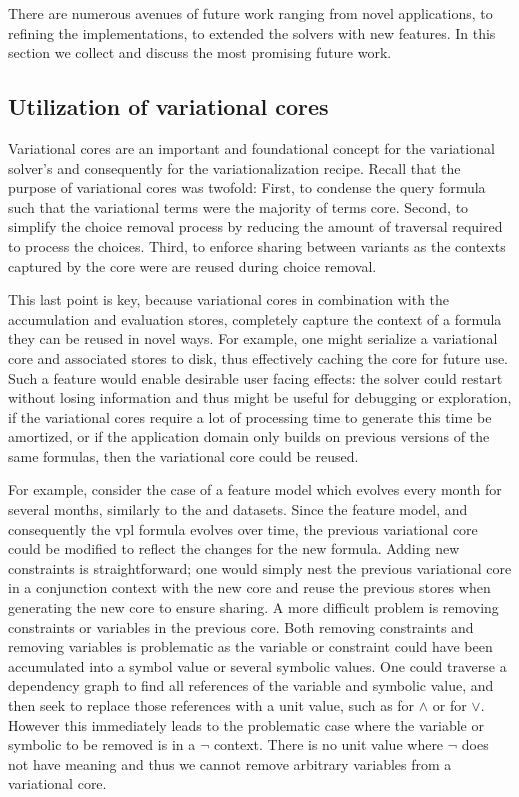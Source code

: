 \label{section:conclusion:future-work}

There are numerous avenues of future work ranging from novel applications, to
refining the implementations, to extended the solvers with new features. In this
section we collect and discuss the most promising future work.

\subsection{Utilization of variational cores}
Variational cores are an important and foundational concept for the variational
solver's and consequently for the variationalization recipe. Recall that the
purpose of variational cores was twofold: First, to condense the query formula
such that the variational terms were the majority of terms core. Second, to
simplify the choice removal process by reducing the amount of traversal required
to process the choices. Third, to enforce sharing between variants as the
contexts captured by the core were are reused during choice removal.

This last point is key, because variational cores in combination with the
accumulation and evaluation stores, completely capture the context of a formula
they can be reused in novel ways. For example, one might serialize a variational
core and associated stores to disk, thus effectively caching the core for future
use. Such a feature would enable desirable user facing effects: the solver could
restart without losing information and thus might be useful for debugging or
exploration, if the variational cores require a lot of processing time to
generate this time be amortized, or if the application domain only builds on
previous versions of the same formulas, then the variational core could be
reused.

For example, consider the case of a feature model which evolves every month for
several months, similarly to the \fin{} and \auto{} datasets. Since the feature
model, and consequently the \ac{vpl} formula evolves over time, the previous
variational core could be modified to reflect the changes for the new formula.
Adding new constraints is straightforward; one would simply nest the previous
variational core in a conjunction context with the new core and reuse the
previous stores when generating the new core to ensure sharing. A more difficult
problem is removing constraints or variables in the previous core. Both removing
constraints and removing variables is problematic as the variable or constraint
could have been accumulated into a symbol value or several symbolic values. One
could traverse a dependency graph to find all references of the variable and
symbolic value, and then seek to replace those references with a unit value,
such as \tru{} for $\wedge$ or \fls{} for $\vee$. However this immediately leads
to the problematic case where the variable or symbolic to be removed is in a
$\neg$ context. There is no unit value where $\neg$ does not have meaning and
thus we cannot remove arbitrary variables from a variational core.

